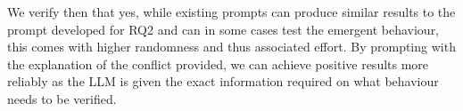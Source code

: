 We verify then that yes, while existing prompts can produce similar results to the prompt developed for RQ2
and can in some cases test the emergent behaviour, this comes with higher randomness and thus associated effort.
By prompting with the explanation of the conflict provided, we can achieve positive results more reliably as the
LLM is given the exact information required on what behaviour needs to be verified.
